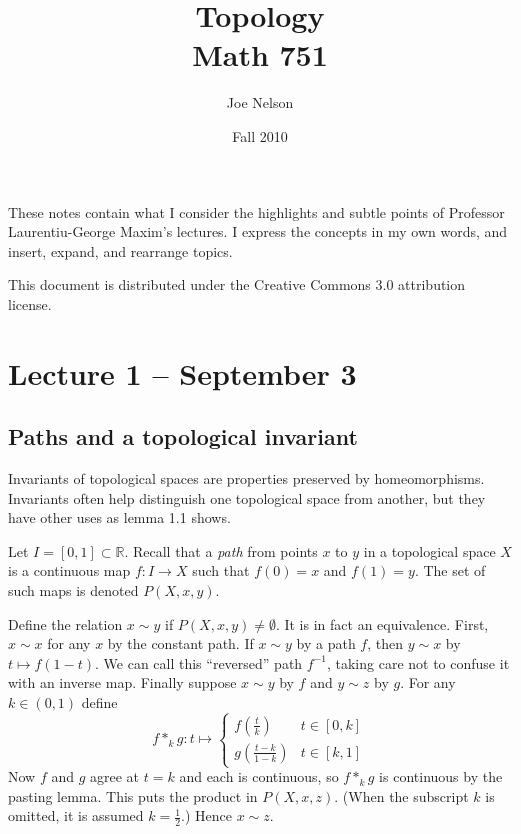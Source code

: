 \documentclass[letterpaper]{article}
\begin{document}
\title{Topology\\
Math 751}
\author{Joe Nelson}
\date{Fall 2010}
\maketitle

These notes contain what I consider the highlights and subtle points of Professor Laurentiu-George Maxim's lectures. I express the concepts in my own words, and insert, expand, and rearrange topics.

This document is distributed under the Creative Commons 3.0 attribution license.

\section{Lecture 1 -- September 3}

\subsection{Paths and a topological invariant}

Invariants of topological spaces are properties preserved by homeomorphisms. Invariants often help distinguish one topological space from another, but they have other uses as lemma 1.1 shows.

Let $I = [0, 1] \subset \mathbb{R}$. Recall that a \emph{path} from points $x$ to $y$ in a topological space $X$ is a continuous map $f \colon I \rightarrow X$ such that $f(0) = x$ and $f(1) = y$. The set of such maps is denoted $P(X, x, y)$.

Define the relation $x \sim y$ if $P(X, x, y) \ne \emptyset$. It is in fact an equivalence. First, $x \sim x$ for any $x$ by the constant path. If $x \sim y$ by a path $f$, then $y \sim x$ by $t \mapsto f(1-t)$. We can call this ``reversed'' path $f^{-1}$, taking care not to confuse it with an inverse map. Finally suppose $x \sim y$ by $f$ and $y \sim z$ by $g$. For any $k \in (0, 1)$ define
\[ f \ast_k g \colon t \mapsto
   \left\{
     \begin{array}{lr}
       f(\frac{t}{k}) & t \in [0, k]\\
       g(\frac{t-k}{1-k}) & t \in [k, 1]
     \end{array}
   \right.
\]
Now $f$ and $g$ agree at $t = k$ and each is continuous, so $f \ast_k g$ is continuous by the pasting lemma. This puts the product in $P(X, x, z)$. (When the subscript $k$ is omitted, it is assumed $k = \frac{1}{2}$.) Hence $x \sim z$.
\end{document}
